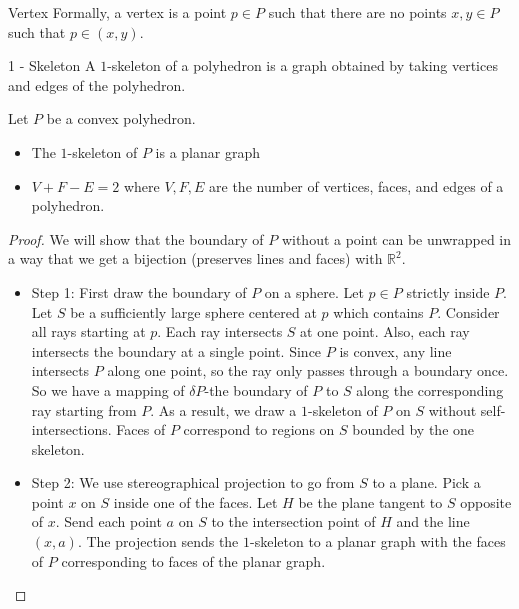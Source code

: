 \documentclass{report}
\begin{document}
\begin{definition}{Vertex}
    Formally, a vertex is a point $p \in P$ such that there are no points $x, y \in P$ such that $p \in (x, y)$.
\end{definition}

\begin{definition}{1 - Skeleton}
    A $1$-skeleton of a polyhedron is a graph obtained by taking vertices and edges of the polyhedron. 
\end{definition}

\begin{theorem}{}
    Let $P$ be a convex polyhedron.
        \begin{itemize}
            \item The $1$-skeleton of $P$ is a planar graph

            \item $V + F - E = 2$ where $V, F, E$ are the number of vertices, faces, and edges of a polyhedron.
        \end{itemize}
\end{theorem}
    \begin{proof}
        We will show that the boundary of $P$ without a point can be unwrapped in a way that we get a bijection (preserves lines and faces) with $\mathbb{R}^{2}$.
            \begin{itemize}
                \item Step 1: First draw the boundary of $P$ on a sphere. Let $p \in P$ strictly inside $P$. Let $S$ be a sufficiently large sphere centered at $p$ which contains $P$. Consider all rays starting at $p$. Each ray intersects $S$ at one point. Also, each ray intersects the boundary at a single point. Since $P$ is convex, any line intersects $P$ along one point, so the ray only passes through a boundary once. So we have a mapping of $\delta P$-the boundary of $P$ to $S$ along the corresponding ray starting from $ P$. As a result, we draw a $1$-skeleton of $P$ on $S$ without self-intersections. Faces of $P$ correspond to regions on $S$ bounded by the one skeleton.

                \item Step 2: We use stereographical projection to go from $S$ to a plane. Pick a point $x$ on $S$ inside one of the faces. Let $H$ be the plane tangent to $S$ opposite of $x$. Send each point $a$ on $S$ to the intersection point of $H$ and the line $(x, a)$. The projection sends the $1$-skeleton to a planar graph with the faces of $P$ corresponding to faces of the planar graph.
            \end{itemize}
    \end{proof}
\end{document}
